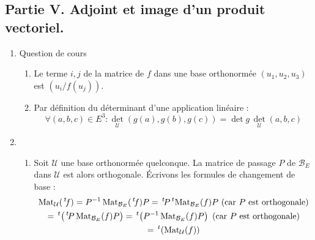 \subsection*{Partie V. Adjoint et image d'un produit vectoriel.}
\begin{enumerate}
 \item Question de cours
\begin{enumerate}
 \item Le terme $i,j$ de la matrice de $f$ dans une base orthonormée $(u_1,u_2,u_3)$ est $(u_i/f(u_j))$.
\item Par définition du déterminant d'une application linéaire :
\begin{displaymath}
 \forall (a,b,c)\in E^3 : \det_{\mathcal U}(g(a),g(b),g(c)) = \det g \, \det_{\mathcal U}(a,b,c)
\end{displaymath}
\end{enumerate}
 
\item\begin{enumerate}
 \item Soit $\mathcal U$ une base orthonormée quelconque. La matrice de passage $P$ de $\mathcal B_E$ dans $\mathcal U$ est alors orthogonale. \'Ecrivons les formules de changement de base :
\begin{multline*}
 \Mat_{\mathcal U} (\trans f) = P^{-1} \Mat_{\mathcal B_E}( \trans f) P 
= \trans P \trans \Mat_{\mathcal B_E}(f)  P \text{ (car $P$ est orthogonale)}\\
= \trans \left( \trans P \Mat_{\mathcal B_E}(f) P\right) 
= \trans \left( P^{-1} \Mat_{\mathcal B_E}(f) P\right) \text{ (car $P$ est orthogonale)} \\
=\trans \left( \Mat_\mathcal U(f) \right) 
\end{multline*}


\end{enumerate}
\end{enumerate}
